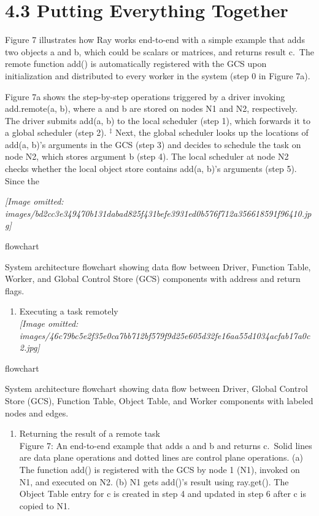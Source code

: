 \documentclass[
]{article}
\providecommand{\tightlist}{%
  \setlength{\itemsep}{0pt}\setlength{\parskip}{0pt}}
\begin{document}
\section{4.3 Putting Everything
Together}\label{putting-everything-together}

Figure 7 illustrates how Ray works end-to-end with a simple example that
adds two objects a and b, which could be scalars or matrices, and
returns result c.~The remote function add() is automatically registered
with the GCS upon initialization and distributed to every worker in the
system (step 0 in Figure 7a).

Figure 7a shows the step-by-step operations triggered by a driver
invoking add.remote(a, b), where a and b are stored on nodes N1 and N2,
respectively. The driver submits add(a, b) to the local scheduler (step
1), which forwards it to a global scheduler (step 2). \(^{\ddagger}\)
Next, the global scheduler looks up the locations of add(a, b)'s
arguments in the GCS (step 3) and decides to schedule the task on node
N2, which stores argument b (step 4). The local scheduler at node N2
checks whether the local object store contains add(a, b)'s arguments
(step 5). Since the

\textit{[Image omitted: images/bd2cc3e349470b131dabad825f431befe3931ed0b576f712a356618591f96410.jpg]}

flowchart

System architecture flowchart showing data flow between Driver, Function
Table, Worker, and Global Control Store (GCS) components with address
and return flags.

\begin{enumerate}
\def\labelenumi{(\alph{enumi})}
\tightlist
\item
  Executing a task remotely\\
  \textit{[Image omitted: images/46c79bc5e2f35e0ca7bb712bf579f9d25e605d32fe16aa55d1034acfab17a0c2.jpg]}
\end{enumerate}

flowchart

System architecture flowchart showing data flow between Driver, Global
Control Store (GCS), Function Table, Object Table, and Worker components
with labeled nodes and edges.

\begin{enumerate}
\def\labelenumi{(\alph{enumi})}
\setcounter{enumi}{1}
\tightlist
\item
  Returning the result of a remote task\\
  Figure 7: An end-to-end example that adds a and b and returns c.~Solid
  lines are data plane operations and dotted lines are control plane
  operations. (a) The function add() is registered with the GCS by node
  1 (N1), invoked on N1, and executed on N2. (b) N1 gets add()'s result
  using ray.get(). The Object Table entry for c is created in step 4 and
  updated in step 6 after c is copied to N1.
\end{enumerate}
\end{document}
